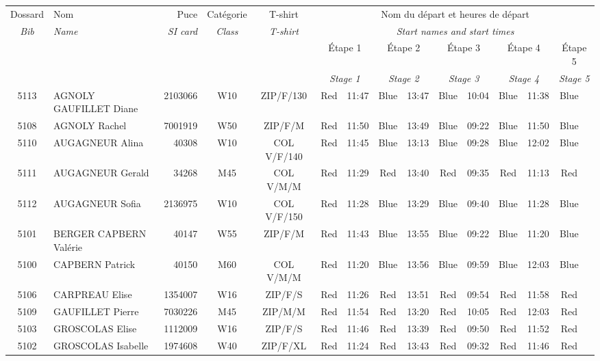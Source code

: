 \documentclass{report}
\begin{document}
  \begin{longtable}{|c|l|r|c|c|*{5}{cc|}}
    Dossard & Nom  & Puce    & Catégorie & T-shirt & \multicolumn{10}{c|}{Nom du départ et heures de départ} \\
    \itshape Bib     & \itshape Name & \itshape SI card & \itshape Class  & \itshape  T-shirt  & \multicolumn{10}{c|}{\itshape Start names and start times} \\
    \hline
    & & & & & \multicolumn{2}{c|}{Étape 1} & \multicolumn{2}{c|}{Étape 2} & \multicolumn{2}{c|}{Étape 3} & \multicolumn{2}{c|}{Étape 4} & \multicolumn{2}{c|}{Étape 5} \\
    & & & & & \multicolumn{2}{c|}{\itshape Stage 1} & \multicolumn{2}{c|}{\itshape Stage 2} & \multicolumn{2}{c|}{\itshape Stage 3} & \multicolumn{2}{c|}{\itshape Stage 4} & \multicolumn{2}{c|}{\itshape Stage 5} \\
    \hline
    5113 & AGNOLY GAUFILLET Diane & 2103066 & W10 & ZIP/F/130 & Red & 11:47 & Blue & 13:47 & Blue & 10:04 & Blue & 11:38 & Blue &  \\
    5108 & AGNOLY Rachel & 7001919 & W50 & ZIP/F/M & Red & 11:50 & Blue & 13:49 & Blue & 09:22 & Blue & 11:50 & Blue &  \\
    5110 & AUGAGNEUR Alina & 40308 & W10 & COL V/F/140 & Red & 11:45 & Blue & 13:13 & Blue & 09:28 & Blue & 12:02 & Blue &  \\
    5111 & AUGAGNEUR Gerald & 34268 & M45 & COL V/M/M & Red & 11:29 & Red & 13:40 & Red & 09:35 & Red & 11:13 & Red &  \\
    5112 & AUGAGNEUR Sofia & 2136975 & W10 & COL V/F/150 & Red & 11:28 & Blue & 13:29 & Blue & 09:40 & Blue & 11:28 & Blue &  \\
    5101 & BERGER CAPBERN Valérie & 40147 & W55 & ZIP/F/M & Red & 11:43 & Blue & 13:55 & Blue & 09:22 & Blue & 11:20 & Blue &  \\
    5100 & CAPBERN Patrick & 40150 & M60 & COL V/M/M & Red & 11:20 & Blue & 13:56 & Blue & 09:59 & Blue & 12:03 & Blue &  \\
    5106 & CARPREAU Elise & 1354007 & W16 & ZIP/F/S & Red & 11:26 & Red & 13:51 & Red & 09:54 & Red & 11:58 & Red &  \\
    5109 & GAUFILLET Pierre & 7030226 & M45 & ZIP/M/M & Red & 11:54 & Red & 13:20 & Red & 10:05 & Red & 12:03 & Red &  \\
    5103 & GROSCOLAS Elise & 1112009 & W16 & ZIP/F/S & Red & 11:46 & Red & 13:39 & Red & 09:50 & Red & 11:52 & Red &  \\
    5102 & GROSCOLAS Isabelle & 1974608 & W40 & ZIP/F/XL & Red & 11:24 & Red & 13:43 & Red & 09:32 & Red & 11:46 & Red &  \\

\end{longtable}
\end{document}
